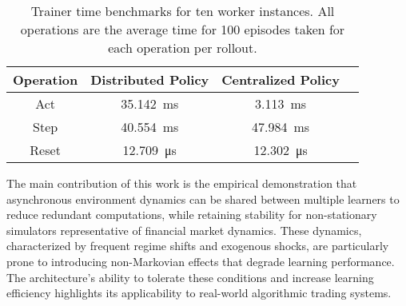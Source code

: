 \begin{table}[h!]
    \centering
    \begin{tabular}{|c|c|c|c|}
        \hline
        \textbf{Operation} & \textbf{Distributed Policy} & \textbf{Centralized Policy} \\
        \hline

        Act                & \SI{35.142}{\milli\second}  & \SI{3.113}{\milli\second}   \\
        Step               & \SI{40.554}{\milli\second}  & \SI{47.984}{\milli\second}  \\
        Reset              & \SI{12.709}{\micro\second}  & \SI{12.302}{\micro\second}  \\
        \hline
    \end{tabular}
    \caption{Trainer time benchmarks for ten worker instances. All operations are the average time for 100 episodes taken for each operation per rollout.}
    \label{tab:benchmarks}
\end{table}

The main contribution of this work is the empirical demonstration that asynchronous environment dynamics
can be shared between multiple learners to reduce redundant computations, while retaining stability for non-stationary simulators representative of financial market dynamics.
These dynamics, characterized by frequent regime shifts and exogenous shocks, are particularly prone to introducing non-Markovian effects that degrade learning performance.
The architecture’s ability to tolerate these conditions and increase learning efficiency highlights its applicability to real-world algorithmic trading systems.

